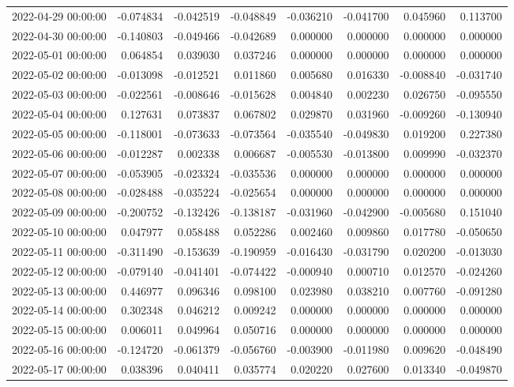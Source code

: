 \begin{tabular}{lrrrrrrr}
2022-04-29 00:00:00 & -0.074834 & -0.042519 & -0.048849 & -0.036210 & -0.041700 & 0.045960 & 0.113700 \\
2022-04-30 00:00:00 & -0.140803 & -0.049466 & -0.042689 & 0.000000 & 0.000000 & 0.000000 & 0.000000 \\
2022-05-01 00:00:00 & 0.064854 & 0.039030 & 0.037246 & 0.000000 & 0.000000 & 0.000000 & 0.000000 \\
2022-05-02 00:00:00 & -0.013098 & -0.012521 & 0.011860 & 0.005680 & 0.016330 & -0.008840 & -0.031740 \\
2022-05-03 00:00:00 & -0.022561 & -0.008646 & -0.015628 & 0.004840 & 0.002230 & 0.026750 & -0.095550 \\
2022-05-04 00:00:00 & 0.127631 & 0.073837 & 0.067802 & 0.029870 & 0.031960 & -0.009260 & -0.130940 \\
2022-05-05 00:00:00 & -0.118001 & -0.073633 & -0.073564 & -0.035540 & -0.049830 & 0.019200 & 0.227380 \\
2022-05-06 00:00:00 & -0.012287 & 0.002338 & 0.006687 & -0.005530 & -0.013800 & 0.009990 & -0.032370 \\
2022-05-07 00:00:00 & -0.053905 & -0.023324 & -0.035536 & 0.000000 & 0.000000 & 0.000000 & 0.000000 \\
2022-05-08 00:00:00 & -0.028488 & -0.035224 & -0.025654 & 0.000000 & 0.000000 & 0.000000 & 0.000000 \\
2022-05-09 00:00:00 & -0.200752 & -0.132426 & -0.138187 & -0.031960 & -0.042900 & -0.005680 & 0.151040 \\
2022-05-10 00:00:00 & 0.047977 & 0.058488 & 0.052286 & 0.002460 & 0.009860 & 0.017780 & -0.050650 \\
2022-05-11 00:00:00 & -0.311490 & -0.153639 & -0.190959 & -0.016430 & -0.031790 & 0.020200 & -0.013030 \\
2022-05-12 00:00:00 & -0.079140 & -0.041401 & -0.074422 & -0.000940 & 0.000710 & 0.012570 & -0.024260 \\
2022-05-13 00:00:00 & 0.446977 & 0.096346 & 0.098100 & 0.023980 & 0.038210 & 0.007760 & -0.091280 \\
2022-05-14 00:00:00 & 0.302348 & 0.046212 & 0.009242 & 0.000000 & 0.000000 & 0.000000 & 0.000000 \\
2022-05-15 00:00:00 & 0.006011 & 0.049964 & 0.050716 & 0.000000 & 0.000000 & 0.000000 & 0.000000 \\
2022-05-16 00:00:00 & -0.124720 & -0.061379 & -0.056760 & -0.003900 & -0.011980 & 0.009620 & -0.048490 \\
2022-05-17 00:00:00 & 0.038396 & 0.040411 & 0.035774 & 0.020220 & 0.027600 & 0.013340 & -0.049870 \\

\end{tabular}
